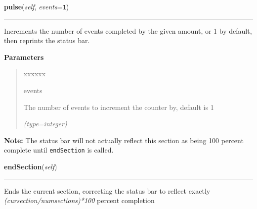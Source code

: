 \hspace{.8\funcindent}\begin{boxedminipage}{\funcwidth}

    \raggedright \textbf{pulse}(\textit{self}, \textit{events}={\tt 1})

    \vspace{-1.5ex}

    \rule{\textwidth}{0.5\fboxrule}
\setlength{\parskip}{2ex}
    Increments the number of events completed by the given amount, or 1 by 
    default, then reprints the status bar.

\setlength{\parskip}{1ex}
      \textbf{Parameters}
      \vspace{-1ex}

      \begin{quote}
        \begin{Ventry}{xxxxxx}

          \item[events]

          The number of events to increment the counter by, default is 1

            {\it (type=integer)}

        \end{Ventry}

      \end{quote}

\textbf{Note:} The status bar will not actually reflect this section as being 100 percent 
complete until \texttt{endSection} is called.



    \end{boxedminipage}

    \label{morpher:misc:section_reporter:SectionReporter:endSection}

    \vspace{0.5ex}

\hspace{.8\funcindent}\begin{boxedminipage}{\funcwidth}

    \raggedright \textbf{endSection}(\textit{self})

    \vspace{-1.5ex}

    \rule{\textwidth}{0.5\fboxrule}
\setlength{\parskip}{2ex}
    Ends the current section, correcting the status bar to reflect exactly 
    \textit{(cursection/numsections)*100} percent completion

\setlength{\parskip}{1ex}
    \end{boxedminipage}


